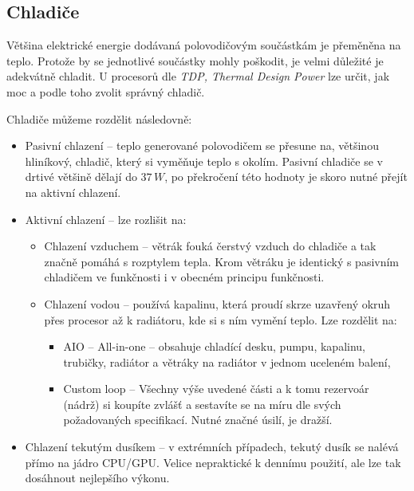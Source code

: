 \documentclass[a4paper]{article}
\begin{document}
    \subsection{Chladiče}
        Většina elektrické energie dodávaná polovodičovým součástkám je přeměněna na teplo. Protože by se jednotlivé součástky mohly poškodit, je velmi důležité je adekvátně chladit. U procesorů dle \textit{TDP, Thermal Design Power} lze určit, jak moc  a podle toho zvolit správný chladič. \par
        Chladiče můžeme rozdělit následovně:
        \begin{itemize}
            \item Pasivní chlazení -- teplo generované polovodičem se přesune na, většinou hliníkový, chladič, který si vyměňuje teplo s okolím. Pasivní chladiče se v drtivé většině dělají do $37\,W$, po překročení této hodnoty je skoro nutné přejít na aktivní chlazení.
            \item Aktivní chlazení -- lze rozlišit na:
            \begin{itemize}
                \item Chlazení vzduchem -- větrák fouká čerstvý vzduch do chladiče a tak značně pomáhá s rozptylem tepla. Krom větráku je identický s pasivním chladičem ve funkčnosti i v obecném principu funkčnosti.
                \item Chlazení vodou -- používá kapalinu, která proudí skrze uzavřený okruh přes procesor až k radiátoru, kde si s ním vymění teplo. Lze rozdělit na:
                \begin{itemize}
                    \item AIO -- All-in-one -- obsahuje chladící desku, pumpu, kapalinu, trubičky, radiátor a větráky na radiátor v jednom uceleném balení, 
                    \item Custom loop -- Všechny výše uvedené části a k tomu rezervoár (nádrž) si koupíte zvlášť a sestavíte se na míru dle svých požadovaných specifikací. Nutné značné úsilí, je dražší.
                \end{itemize}
            \end{itemize}
            \item Chlazení tekutým dusíkem -- v extrémních případech, tekutý dusík se nalévá přímo na jádro CPU/GPU. Velice nepraktické k dennímu použití, ale lze tak dosáhnout nejlepšího výkonu.
        \end{itemize}
\end{document}
